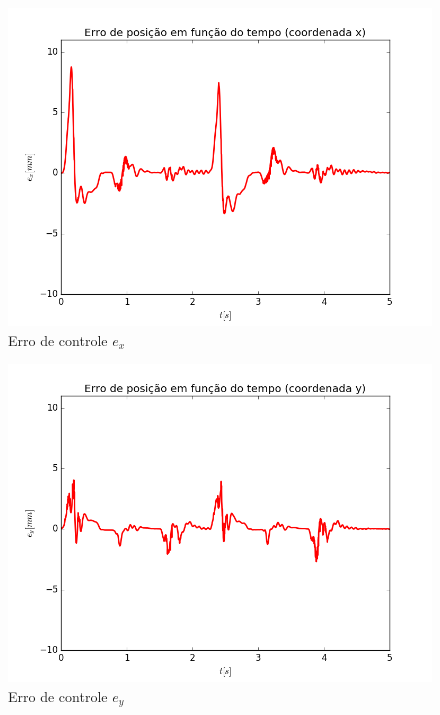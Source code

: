 \documentclass[]{politex}
\begin{document}
\begin{multicols}{2}
\begin{figure}[H]
	\centering
	\includegraphics[scale=0.39]{../../../Experimental/Aquisicoes/SMCt_triangulo/ex.png}  
	\caption{Erro de controle $e_x$}
	\label{fig:SMCq_triangulo_ex}
\end{figure}
\begin{figure}[H]
	\centering
	\includegraphics[scale=0.39]{../../../Experimental/Aquisicoes/SMCt_triangulo/ey.png}  
	\caption{Erro de controle $e_y$}
	\label{fig:SMCq_triangulo_ey}
\end{figure}
\end{multicols}
\end{document}
